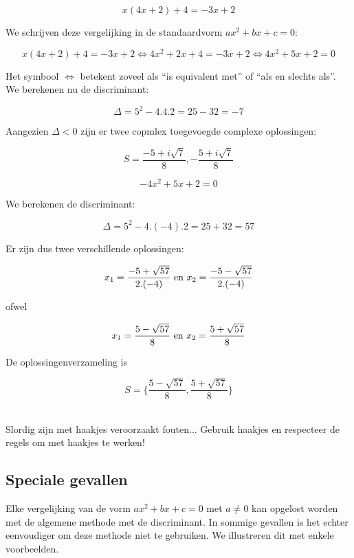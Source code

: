 \begin{voorbeeld}
	

\[ x(4x+2)+4 = -3x+2 \]

We schrijven deze vergelijking in de standaardvorm $ax^2 +bx + c =0$:

\[ x(4x+2)+4 = -3x+2 \Leftrightarrow 4x^2 + 2x +4 = -3x +2 \Leftrightarrow 4x^2 + 5x +2 = 0 \]

Het symbool $\Leftrightarrow$ betekent zoveel als ``is equivalent met'' of ``als en slechts als''.\\
We berekenen nu de discriminant:

\[ \Delta = 5^2 - 4.4.2= 25-32= -7 \]

Aangezien $\Delta < 0$ zijn er twee copmlex toegevoegde complexe oplossingen:

\[ S= \frac{-5+i\sqrt{7}}{8}, -\frac{5+i\sqrt{7}}{8} \]

\end{voorbeeld}
\begin{voorbeeld}
	

\[ -4x^2 +5x +2=0 \]

We berekenen de discriminant:

\[ \Delta = 5^2 - 4.(-4).2 = 25 + 32 =57 \]

Er zijn dus twee verschillende oplossingen:

\[ x_{1}=\frac{-5 + \sqrt{57}}{2.(-4)} \textup{  en  } x_{2}=\frac{-5 - \sqrt{57}}{2.(-4)} \]

ofwel

\[ x_{1}=\frac{5 - \sqrt{57}}{8} \textup{  en  } x_{2}=\frac{5 + \sqrt{57}}{8} \]

De oplossingenverzameling is

\[ S=\{ \frac{5 - \sqrt{57}}{8}, \frac{5 + \sqrt{57}}{8} \} \] \\

\begin{opmerking}
	Slordig zijn met haakjes veroorzaakt fouten... Gebruik haakjes en respecteer de regels om met haakjes te werken!
\end{opmerking}

\end{voorbeeld}
\subsection{Speciale gevallen}

Elke vergelijking van de vorm $ax^2 +bx +c =0$ met $a \neq 0$ kan opgelost worden met de algemene methode met de discriminant. In sommige gevallen is het echter eenvoudiger om deze methode niet te gebruiken. We illustreren dit met enkele voorbeelden.


